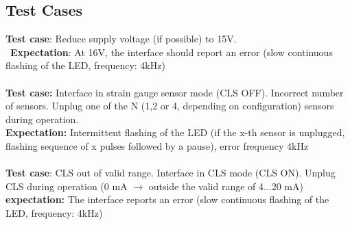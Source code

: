 \documentclass[12pt,a4paper]{article}
\begin{document}
	\subsection*{Test Cases}
	\textbf{Test case}: Reduce supply voltage (if possible) to 15V.\\\
	\textbf{Expectation}: At 16V, the interface should report an error (slow continuous flashing of the LED, frequency: 4kHz)\\
	\\\noindent
	\textbf{Test case:} Interface in strain gauge sensor mode (CLS OFF). Incorrect number of sensors. Unplug one of the N (1,2 or 4, depending on configuration) sensors during operation.\\
	\textbf{Expectation:} Intermittent flashing of the LED (if the x-th sensor is unplugged, flashing sequence of x pulses followed by a pause), error frequency 4kHz\\\
	\\\noindent
	\textbf{Test case}: CLS out of valid range. Interface in CLS mode (CLS ON). Unplug CLS during operation (0 mA $\rightarrow$ outside the valid range of 4...20 mA)\\
	\textbf{expectation:} The interface reports an error (slow continuous flashing of the LED, frequency: 4kHz)\\
	
\end{document}
